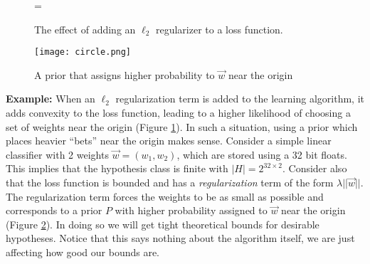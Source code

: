 \documentclass{article}
\begin{document}
\begin{figure}[H]
    =
    \caption{The effect of adding an $\ell_2$ regularizer to a loss function.}
    \label{fig:l2_reg}
\end{figure}

\vspace*{0.5cm}
\begin{figure}[H]
    \captionsetup{justification=centering}
	\texttt{[image: circle.png]}
    \caption{A prior that assigns higher probability to $\Vec{w}$ near the origin}
    \label{fig:circle}
\end{figure}
\vspace*{0.5cm}

\textbf{Example:} When an $\ell_2$ regularization term is added to the learning algorithm, it adds convexity to the loss function, leading to a higher likelihood of choosing a set of weights near the origin (Figure \ref{fig:l2_reg}). In such a situation, using a prior which places heavier ``bets'' near the origin makes sense. Consider a simple linear classifier with 2 weights $\Vec{w} = (w_1, w_2)$, which are stored using a 32 bit floats. This implies that the hypothesis class is finite with $|H|=2^{32 \times 2}$. Consider also that the loss function is bounded and has a \emph{regularization} term of the form $\lambda||\Vec{w}||$. The regularization term forces the weights to be as small as possible and corresponds to a prior $P$ with higher probability assigned to $\Vec{w}$ near the origin (Figure \ref{fig:circle}). In doing so we will get tight theoretical bounds for desirable hypotheses. Notice that this says nothing about the algorithm itself, we are just affecting how good our bounds are.
\end{document}
